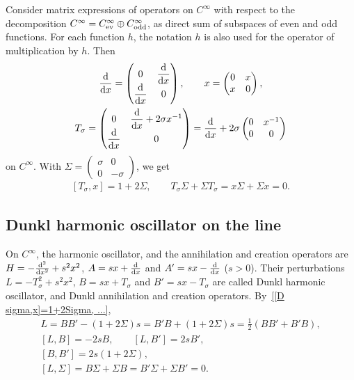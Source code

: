 \documentclass[pdftex]{sigma}
\newcommand{\Cinf}{C^\infty}
\begin{document}
Consider matrix expressions of operators on $\Cinf$ with respect to the decomposition $\Cinf=\Cinf_{\text{\rm ev}}\oplus\Cinf_{\text{\rm odd}}$, as direct sum of subspaces of even and odd functions. For each function $h$, the notation $h$ is also used for the operator of multiplication by $h$. Then
  \begin{gather*}
    \frac{{\rm d}}{{\rm d}x}=
      \begin{pmatrix}
        0 &  \dfrac{{\rm d}}{{\rm d}x} \\
        \dfrac{{\rm d}}{{\rm d}x} & 0
      \end{pmatrix} ,\qquad
    x=
      \begin{pmatrix}
        0 &  x \\
        x & 0
      \end{pmatrix} ,\\
    T_\sigma=
      \begin{pmatrix}
        0 &  \dfrac{{\rm d}}{{\rm d}x}+2\sigma x^{-1} \\
        \dfrac{{\rm d}}{{\rm d}x} & 0
      \end{pmatrix}
    = \frac{{\rm d}}{{\rm d}x}+2\sigma
      \begin{pmatrix}
        0 &  x^{-1} \\
        0 & 0
      \end{pmatrix}
  \end{gather*}
on $\Cinf$. With
$
  \Sigma=
    \begin{pmatrix}
      \sigma & 0 \\
      0 & -\sigma
    \end{pmatrix}
$,
we get
  \begin{gather}\label{[D sigma,x]=1+2Sigma, ...}
    [T_\sigma,x]=1+2\Sigma ,\qquad
    T_\sigma\Sigma+\Sigma T_\sigma=x \Sigma+\Sigma x=0 .
  \end{gather}

\subsection{Dunkl harmonic oscillator on the line}\label{ss:L}

On $\Cinf$, the harmonic oscillator, and the annihilation and creation operators are $H=-\frac{{\rm d}^2}{{\rm d}x^2}+s^2x^2$, $A=sx+\frac{{\rm d}}{{\rm d}x}$ and $A'=sx-\frac{{\rm d}}{{\rm d}x}$ ($s>0$). Their perturbations $L=-T_\sigma^2+s^2x^2$, $B=sx+T_\sigma$ and $B'=sx-T_\sigma$ are called Dunkl harmonic oscillator, and Dunkl annihilation and creation operators. By~\eqref{[D sigma,x]=1+2Sigma, ...},
  \begin{gather}
    L=BB'-(1+2\Sigma)s=B'B+(1+2\Sigma)s=\frac{1}{2}(BB'+B'B) ,\label{L}\\
    [L,B]=-2sB ,\qquad[L,B']=2sB' ,\label{[L,B]}\\
    [B,B']=2s(1+2\Sigma) ,\label{[B,B']}\\
    [L,\Sigma]=B\Sigma+\Sigma B=B'\Sigma+\Sigma B'=0 .
    \label{[L,Sigma]=B' Sigma+Sigma B'=0}
  \end{gather}
\end{document}
